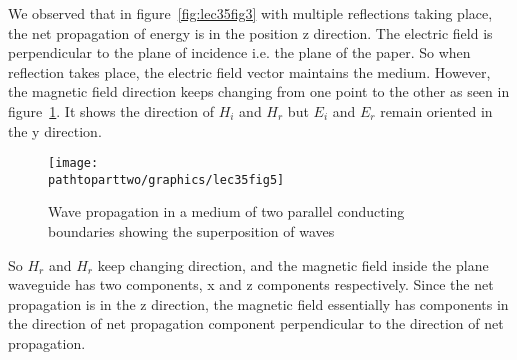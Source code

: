 We observed that in figure~\ref{fig:lec35fig3} with multiple reflections taking place, the net propagation of energy is in the position z direction. The electric field is perpendicular to the plane of incidence i.e. the plane of the paper. So when reflection takes place, the electric field vector maintains the medium. However, the magnetic field direction keeps changing from one point to the other as seen in figure~\ref{fig:lec35fig5}. It shows the direction of $H_i$ and $H_r$ but $E_i$ and $E_r$ remain oriented in the y direction.
\begin{figure}[h]
\centering
\texttt{[image: \\pathtoparttwo/graphics/lec35fig5]}
\caption{Wave propagation in a medium of two parallel conducting boundaries showing the superposition of waves}
\label{fig:lec35fig5}
\end{figure}
So $H_r$ and $H_r$ keep changing direction, and the magnetic field inside the plane waveguide has two components, x and z components respectively. Since the net propagation is in the z direction, the magnetic field essentially has components in the direction of net propagation component perpendicular to the direction of net propagation.

